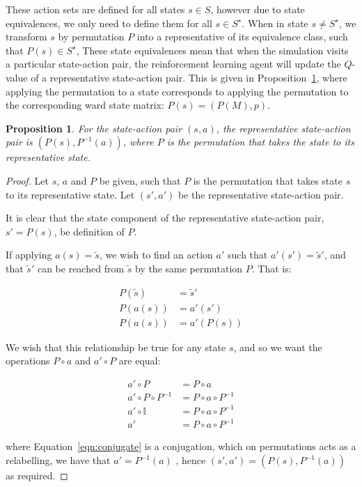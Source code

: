\documentclass{article}
\newtheorem{proposition}{Proposition}
\begin{document}
These action sets are defined for all states $s \in S$, however due to state
equivalences, we only need to define them for all $s \in S^{\star}$.
When in state $s \neq S^{\star}$, we transform $s$ by permutation $P$ into a
representative of its equivalence class, such that $P(s) \in S^{\star}$,
These state equivalences mean that when the simulation visits a particular
state-action pair, the reinforcement learning agent will update the $Q$-value
of a representative state-action pair.
This is given in Proposition~\ref{thrm:representative_stateaction}, where
applying the permutation to a state corresponds to applying the permutation to
the corresponding ward state matrix: $P(s) = (P(M), p)$.

\begin{proposition}\label{thrm:representative_stateaction}
For the state-action pair $(s, a)$, the representative state-action pair is
$(P(s), P^{-1}(a))$, where $P$ is the permutation that takes the state to its
representative state.
\end{proposition}

\begin{proof}
Let $s$, $a$ and $P$ be given, such that $P$ is the permutation that takes
state $s$ to its representative state.
Let $(s', a')$ be the representative state-action pair.

It is clear that the state component of the representative state-action pair,
$s' = P(s)$, be definition of $P$.

If applying $a(s) = \tilde{s}$, we wish to find an action $a'$ such that
$a'(s') = \tilde{s}'$, and that $\tilde{s}'$ can be reached from $\tilde{s}$ by
the same permutation $P$.
That is:

\begin{align}
P(\tilde{s}) &= \tilde{s}' \\
P(a(s)) &= a'(s') \\
P(a(s)) &= a'(P(s))
\end{align}

We wish that this relationship be true for any state $s$, and so we want the
operations $P \circ a$ and $a' \circ P$ are equal:

\begin{align}
a' \circ P &= P \circ a \\
a' \circ P \circ P^{-1} &= P \circ a \circ P^{-1} \\
a' \circ \mathbb{I} &= P \circ a \circ P^{-1} \\
a' &= P \circ a \circ P^{-1} \label{eqn:conjugate}
\end{align}

where Equation~\ref{eqn:conjugate} is a conjugation, which on permutations
acts as a relabelling, we have that $a' = P^{-1}(a)$ \cite[p.~125]{dummit04},
hence $(s', a') = (P(s), P^{-1}(a))$ as required.
\end{proof}
\end{document}
